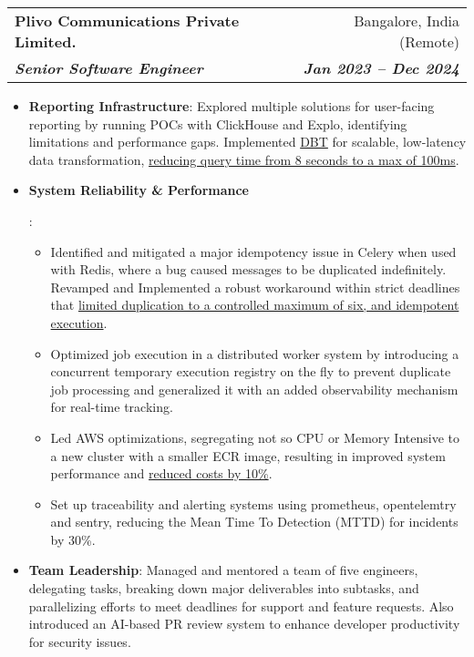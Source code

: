 \documentclass[letterpaper,10.5pt]{article}
\makeatletter
\newcommand{\resumeItem}[2]{
  \item\small{
    \textbf{#1}{: #2 \vspace{-2pt}}
  }
}
\newcommand{\resumeSubheading}[4]{
  \vspace{-1pt}\item
    \begin{tabular*}{0.97\textwidth}[t]{l@{\extracolsep{\fill}}r}
      \textbf{#1} & #2 \\
      \textbf{\textit{\small\color{rolecolor}#3}} & \textbf{\textit{\small #4}} \\
    \end{tabular*}\vspace{-5pt}
}
\newcommand{\resumeItemListStart}{\begin{itemize}}
\newcommand{\resumeItemListEnd}{\end{itemize}\vspace{-5pt}}
\makeatother
\begin{document}
    \resumeSubheading
      {Plivo Communications Private Limited.}{Bangalore, India (Remote)}
      {Senior Software Engineer}{Jan 2023 -- Dec 2024}
      \resumeItemListStart
        \resumeItem{Reporting Infrastructure}
          {Explored multiple solutions for user-facing reporting by running POCs with ClickHouse and Explo, identifying limitations and performance gaps. Implemented \underline{DBT} for scalable, low-latency data transformation, \underline{reducing query time from 8 seconds to a max of 100ms}.}
        \resumeItem{System Reliability \& Performance}{
          \begin{itemize}[label=$\circ$]
            \item Identified and mitigated a major idempotency issue in Celery when used with Redis, where a bug caused messages to be duplicated indefinitely. Revamped and Implemented a robust workaround within strict deadlines that \underline{limited duplication to a controlled maximum of six, and idempotent execution}.
            \item Optimized job execution in a distributed worker system by introducing a concurrent temporary execution registry on the fly to prevent duplicate job processing and generalized it with an added observability mechanism for real-time tracking.
            \item Led AWS optimizations, segregating not so CPU or Memory Intensive to a new cluster with a smaller ECR image, resulting in improved system performance and \underline{reduced costs by 10\%}.
            \item Set up traceability and alerting systems using prometheus, opentelemtry and sentry, reducing the Mean Time To Detection (MTTD) for incidents by 30\%.
          \end{itemize}
        }
        \resumeItem{Team Leadership}
          {Managed and mentored a team of five engineers, delegating tasks, breaking down major deliverables into subtasks, and parallelizing efforts to meet deadlines for support and feature requests. Also introduced an AI-based PR review system to enhance developer productivity for security issues.}
      \resumeItemListEnd
\end{document}
